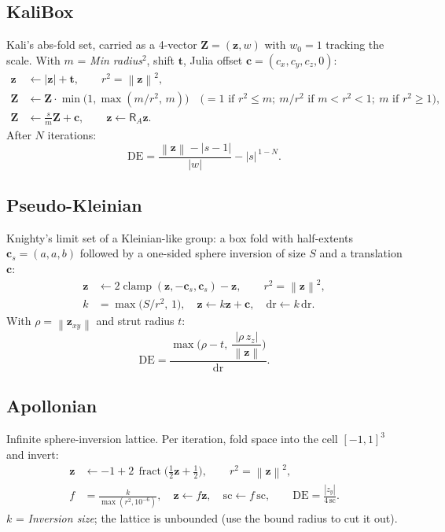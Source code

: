 \documentclass[10pt,a4paper]{article}
\newcommand{\vv}[1]{\mathbf{#1}}
\newcommand{\abs}[1]{\left|#1\right|}
\newcommand{\norm}[1]{\left\lVert#1\right\rVert}
\newcommand{\clamp}{\operatorname{clamp}}
\newcommand{\fract}{\operatorname{fract}}
\newcommand{\Rot}{\mathsf{R}}
\newcommand{\DE}{\mathrm{DE}}
\begin{document}
\subsection{KaliBox}
Kali's abs-fold set, carried as a 4-vector $\vv Z=(\vv z,w)$ with $w_0=1$ tracking the scale. With $m$ = \emph{Min radius}$^2$, shift $\vv t$, Julia offset $\vv c=(c_x,c_y,c_z,0)$:
\begin{align}
\vv z&\leftarrow\abs{\vv z}+\vv t,\qquad r^2=\norm{\vv z}^2,\\
\vv Z&\leftarrow\vv Z\cdot\min\!\big(1,\max(m/r^2,\,m)\big)\quad\Big(=1\text{ if }r^2\le m;\ m/r^2\text{ if }m<r^2<1;\ m\text{ if }r^2\ge 1\Big),\\
\vv Z&\leftarrow\frac{s}{m}\vv Z+\vv c,\qquad\vv z\leftarrow\Rot_A\vv z.
\end{align}
After $N$ iterations:
\begin{equation}\DE=\frac{\norm{\vv z}-\abs{s-1}}{\abs w}-\abs s^{\,1-N}.\end{equation}


\subsection{Pseudo-Kleinian}
Knighty's limit set of a Kleinian-like group: a box fold with half-extents $\vv c_s=(a,a,b)$ followed by a one-sided sphere inversion of size $S$ and a translation $\vv c$:
\begin{align}
\vv z&\leftarrow 2\clamp(\vv z,-\vv c_s,\vv c_s)-\vv z,\qquad r^2=\norm{\vv z}^2,\\
k&=\max\!\big(S/r^2,\,1\big),\quad\vv z\leftarrow k\vv z+\vv c,\quad\mathrm{dr}\leftarrow k\,\mathrm{dr}.
\end{align}
With $\rho=\norm{\vv z_{xy}}$ and strut radius $t$:
\begin{equation}\DE=\frac{\max\!\Big(\rho-t,\ \dfrac{\abs{\rho\,z_z}}{\norm{\vv z}}\Big)}{\mathrm{dr}}.\end{equation}


\subsection{Apollonian}
Infinite sphere-inversion lattice. Per iteration, fold space into the cell $[-1,1]^3$ and invert:
\begin{align}
\vv z&\leftarrow-1+2\,\fract\!\big(\tfrac12\vv z+\tfrac12\big),\qquad r^2=\norm{\vv z}^2,\\
f&=\frac{k}{\max(r^2,10^{-6})},\quad\vv z\leftarrow f\vv z,\quad \mathrm{sc}\leftarrow f\,\mathrm{sc},\qquad\DE=\frac{\abs{z_y}}{4\,\mathrm{sc}}.
\end{align}
$k$ = \emph{Inversion size}; the lattice is unbounded (use the bound radius to cut it out).

\end{document}
